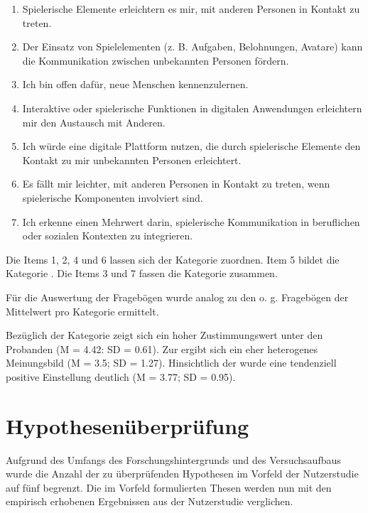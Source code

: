 \begin{enumerate}
    \item Spielerische Elemente erleichtern es mir, mit anderen Personen in Kontakt zu treten.
    \item Der Einsatz von Spielelementen (z. B. Aufgaben, Belohnungen, Avatare) kann die Kommunikation zwischen unbekannten Personen fördern.
    \item Ich bin offen dafür, neue Menschen kennenzulernen.
    \item Interaktive oder spielerische Funktionen in digitalen Anwendungen erleichtern mir den Austausch mit Anderen.
    \item Ich würde eine digitale Plattform nutzen, die durch spielerische Elemente den Kontakt zu mir unbekannten Personen erleichtert.
    \item Es fällt mir leichter, mit anderen Personen in Kontakt zu treten, wenn spielerische Komponenten involviert sind.
    \item Ich erkenne einen Mehrwert darin, spielerische Kommunikation in beruflichen oder sozialen Kontexten zu integrieren.
\end{enumerate}

Die Items 1, 2, 4 und 6 lassen sich der Kategorie  zuordnen. Item 5 bildet die Kategorie  . Die Items 3 und 7 fassen die Kategorie  zusammen.

Für die Auswertung der Fragebögen wurde analog zu den o. g. Fragebögen der Mittelwert pro Kategorie ermittelt.

Bezüglich der Kategorie  zeigt sich ein hoher Zustimmungswert unter den Probanden (M = 4.42: SD = 0.61). Zur  ergibt sich ein eher heterogenes Meinungsbild (M = 3.5; SD = 1.27). Hinsichtlich der  wurde eine tendenziell positive Einstellung deutlich (M = 3.77; SD = 0.95).

\section{Hypothesenüberprüfung}

Aufgrund des Umfangs des Forschungshintergrunds und des Versuchsaufbaus wurde die Anzahl der zu überprüfenden Hypothesen im Vorfeld der Nutzerstudie auf fünf begrenzt. Die im Vorfeld formulierten Thesen werden nun mit den empirisch erhobenen Ergebnissen aus der Nutzerstudie verglichen.

